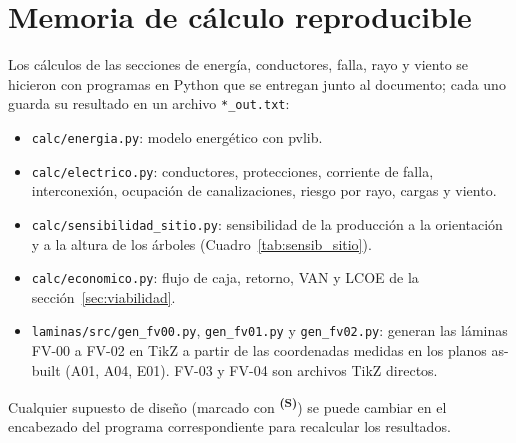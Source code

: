 \documentclass[12pt]{article}
\newcommand{\supuesto}{\textsuperscript{\textcolor{orange!80!black}{\textbf{(S)}}}}
\begin{document}
\section{Memoria de cálculo reproducible}
Los cálculos de las secciones de energía, conductores, falla, rayo y viento se hicieron con programas en Python que se entregan junto al documento; cada uno guarda su resultado en un archivo \texttt{*\_out.txt}:
\begin{itemize}
\item \texttt{calc/energia.py}: modelo energético con pvlib.
\item \texttt{calc/electrico.py}: conductores, protecciones, corriente de falla, interconexión, ocupación de canalizaciones, riesgo por rayo, cargas y viento.
\item \texttt{calc/sensibilidad\_sitio.py}: sensibilidad de la producción a la orientación y a la altura de los árboles (Cuadro~\ref{tab:sensib_sitio}).
\item \texttt{calc/economico.py}: flujo de caja, retorno, VAN y LCOE de la sección~\ref{sec:viabilidad}.
\item \texttt{laminas/src/gen\_fv00.py}, \texttt{gen\_fv01.py} y \texttt{gen\_fv02.py}: generan las láminas FV-00 a FV-02 en TikZ a partir de las coordenadas medidas en los planos as-built (A01, A04, E01). FV-03 y FV-04 son archivos TikZ directos.
\end{itemize}
Cualquier supuesto de diseño (marcado con \supuesto{}) se puede cambiar en el encabezado del programa correspondiente para recalcular los resultados.
\end{document}
